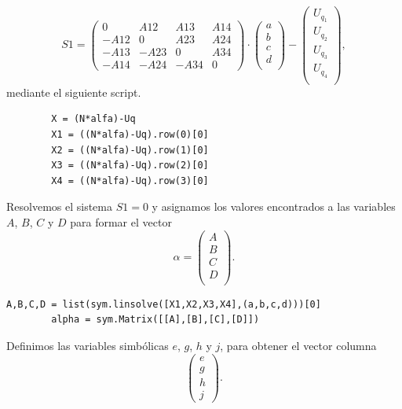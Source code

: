 \documentclass[a4paper,10pt]{book}
\begin{document}
\[ S1 = \left( \begin{array}{cccc}
              0   & A12  & A13  & A14  \\
             -A12 & 0    & A23  & A24  \\
             -A13 & -A23 & 0    & A34  \\
             -A14 & -A24 & -A34 & 0   
             \end{array}
   \right) \cdot \left( \begin{array}{c}
               			a \\
               			b \\ 
               			c \\
               			d \\
                   		\end{array}
                 \right)- \left( \begin{array}{c}
               			U_{q_{1}} \\
               			U_{q_{2}} \\ 
               			U_{q_{3}}\\
               			U_{q_{4}} \\
                   		\end{array}
                 \right) ,\]
mediante el siguiente script.
\lstset{stepnumber=0}
\begin{lstlisting} 
        X = (N*alfa)-Uq
        X1 = ((N*alfa)-Uq).row(0)[0]
        X2 = ((N*alfa)-Uq).row(1)[0]
        X3 = ((N*alfa)-Uq).row(2)[0]
        X4 = ((N*alfa)-Uq).row(3)[0]
\end{lstlisting}
Resolvemos el sistema $S1=0$ y asignamos los valores encontrados a las variables $A$, $B$, $C$ y $D$ para formar el vector
\[ \alpha = \left( \begin{array}{c}
               			A \\
               			B \\ 
               			C \\
               			D \\
                   		\end{array}
                 \right) .\] 
\lstset{stepnumber=0}
\begin{lstlisting}
A,B,C,D = list(sym.linsolve([X1,X2,X3,X4],(a,b,c,d)))[0]
        alpha = sym.Matrix([[A],[B],[C],[D]])
\end{lstlisting}
Definimos las variables simb\'olicas $e$, $g$, $h$ y $j$, para obtener el vector columna 
\[ \left( \begin{array}{c}
             e  \\
             g  \\
             h  \\
             j     
             \end{array}
   \right). \] 
\end{document}

